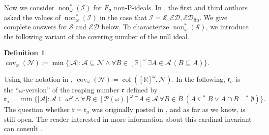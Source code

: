 \documentclass[a4paper,12pt]{amsart}
\theoremstyle{definition}
\newtheorem{dfn}[thm]{Definition}
\numberwithin{thm}{section}
\numberwithin{equation}{section}
\newcommand{\rr}{\mathfrak{r}}
\newcommand{\n}{\mathcal{N}}
\DeclareMathOperator{\non}{non}
\DeclareMathOperator{\cof}{cof}
\newcommand{\ed}{\mathcal{ED}}
\newcommand{\I}{\mathscr{I}}
\newcommand{\edfin}{\mathcal{ED}_\mathrm{fin}}
\newcommand{\covomn}{\operatorname{cov}_\omega(\mathcal{N})}
\renewcommand{\subset}{\subseteq}
\newcommand{\Baire}{\omega^{\omega}}
\newcommand{\Solecki}{\mathcal{S}}
\begin{document}
    Now we consider $\non^*_\omega(\I)$ for $F_\sigma$ non-P-ideals. In \cite[Question 4.11]{CM25}, the first and third authors asked the values of $\non^*_\omega(\I)$ in the case that $\I = \Solecki, \ed, \edfin$. We give complete answers for $\Solecki$ and $\ed$ below. To characterize $\non^*_\omega(\Solecki)$, we introduce the following variant of the covering number of the null ideal.

    \begin{dfn}
        $\covomn\coloneqq\min\{\lvert\mathcal{A}\rvert:\mathcal{A}\subset\n \land \forall B\in[\mathbb{R}]^\omega\,\exists A\in\mathcal{A}\,(B\subseteq A)\}$.
    \end{dfn}

    Using the notation in \cite[Definition 2.1.3]{BJ95}, $\covomn=\cof([\mathbb{R}]^{\omega},\n)$.
    In the following, $\rr_\sigma$ is the ``$\omega$-version'' of the reaping number $\rr$ defined by
    \[
    \rr_\sigma = \min \{ |\mathcal{A}| : \mathcal{A} \subseteq \Baire \land \forall \overline{B}\in[\mathcal{P}(\omega)]^\omega ~ \exists A \in \mathcal{A} ~ \forall B\in\overline{B} ~ (A \subseteq^* B \lor A \cap B =^* \emptyset)\}.
    \]
    The question whether $\rr = \rr_\sigma$ was originally posted in \cite{VOJTAS1992125}, and as far as we know, is still open. The reader interested in more information about this cardinal invariant can consult \cite{Bla10}.
\end{document}
